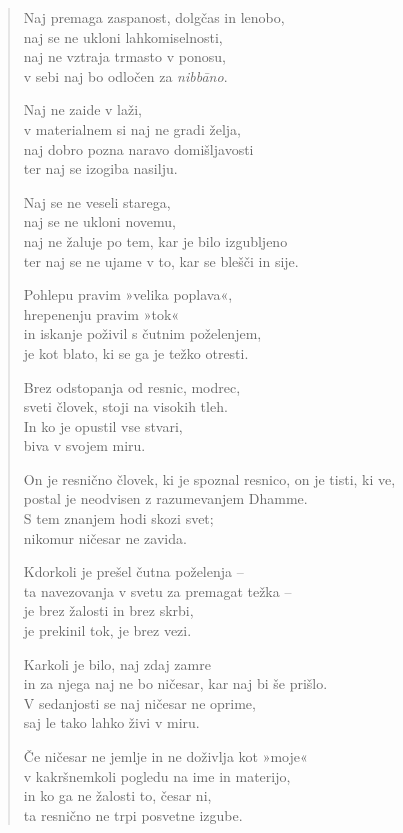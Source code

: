 \begin{verse}
Naj premaga zaspanost, dolgčas in lenobo,\\
naj se ne ukloni lahkomiselnosti,\\
naj ne vztraja trmasto v ponosu,\\
v sebi naj bo odločen za \emph{nibbāno}.

Naj ne zaide v laži,\\
v materialnem si naj ne gradi želja,\\
naj dobro pozna naravo domišljavosti\\
ter naj se izogiba nasilju.

Naj se ne veseli starega,\\
naj se ne ukloni novemu,\\
naj ne žaluje po tem, kar je bilo izgubljeno\\
ter naj se ne ujame v to, kar se blešči in sije.

Pohlepu pravim »velika poplava«,\\
hrepenenju pravim »tok«\\
in iskanje poživil s čutnim poželenjem,\\
je kot blato, ki se ga je težko otresti.

Brez odstopanja od resnic, modrec,\\
sveti človek, stoji na visokih tleh.\\
In ko je opustil vse stvari,\\
biva v svojem miru.

On je resnično človek, ki je spoznal resnico, on je tisti, ki ve,\\
postal je neodvisen z razumevanjem Dhamme.\\
S tem znanjem hodi skozi svet;\\
nikomur ničesar ne zavida.

Kdorkoli je prešel čutna poželenja --\\
ta navezovanja v svetu za premagat težka --\\
je brez žalosti in brez skrbi,\\
je prekinil tok, je brez vezi.

Karkoli je bilo, naj zdaj zamre\\
in za njega naj ne bo ničesar, kar naj bi še prišlo.\\
V sedanjosti se naj ničesar ne oprime,\\
saj le tako lahko živi v miru.

Če ničesar ne jemlje in ne doživlja kot »moje«\\
v kakršnemkoli pogledu na ime in materijo,\\
in ko ga ne žalosti to, česar ni,\\
ta resnično ne trpi posvetne izgube.


\end{verse}
